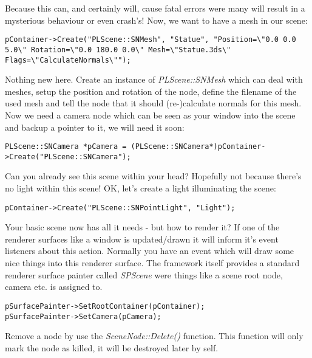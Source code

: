 Because this can, and certainly will, cause fatal errors were many will result in a mysterious behaviour or even crash's! Now, we want to have a mesh in our scene:

\begin{lstlisting}[caption=Creating a new scene node mesh instance]
pContainer->Create("PLScene::SNMesh", "Statue", "Position=\"0.0 0.0 5.0\" Rotation=\"0.0 180.0 0.0\" Mesh=\"Statue.3ds\" Flags=\"CalculateNormals\"");
\end{lstlisting}

Nothing new here. Create an instance of \emph{PLScene::SNMesh} which can deal with meshes, setup the position and rotation of the node, define the filename of the used mesh and tell the node that it should (re-)calculate normals for this mesh. Now we need a camera node which can be seen as your window into the scene and backup a pointer to it, we will need it soon:

\begin{lstlisting}[caption=Creating a new camera scene node instance]
PLScene::SNCamera *pCamera = (PLScene::SNCamera*)pContainer->Create("PLScene::SNCamera");
\end{lstlisting}

Can you already see this scene within your head? Hopefully not because there's no light within this scene! OK, let's create a light illuminating the scene:

\begin{lstlisting}[caption=Creating a new light scene node instance]
pContainer->Create("PLScene::SNPointLight", "Light");
\end{lstlisting}

Your basic scene now has all it needs - but how to render it? If one of the renderer surfaces like a window is updated/drawn it will inform it's event listeners about this action. Normally you have an event which will draw some nice things into this renderer surface. The framework itself provides a standard renderer surface painter called \emph{SPScene} were things like a scene root node, camera etc. is assigned to.

\begin{lstlisting}[caption=SPScene setup]
pSurfacePainter->SetRootContainer(pContainer);
pSurfacePainter->SetCamera(pCamera);
\end{lstlisting}

Remove a node by use the \emph{SceneNode::Delete()} function. This function will only mark the node as killed, it will be destroyed later by self.

